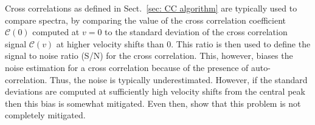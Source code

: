 \documentclass{aa}
\begin{document}

Cross correlations as defined in Sect.~\ref{sec: CC algorithm} are typically used to compare spectra, by comparing the value of the cross correlation coefficient $\mathcal{C}(0)$ computed at $v=0$ to the standard deviation of the cross correlation signal $\mathcal{C}(v)$ at higher velocity shifts than $0$.
This ratio is then used to define the signal to noise ratio (S/N) for the cross correlation.
This, however, biases the noise estimation for a cross correlation because of the presence of auto-correlation.
Thus, the noise is typically underestimated.
However, if the standard deviations are computed at sufficiently high velocity shifts from the central peak \citep[e.g., for $|v|\ge 250$ km/s in][]{2018AHoeijmakersMM} then this bias is somewhat mitigated.
Even then, \citet{ruffio2019radial} show that this problem is not completely mitigated. 
\end{document}
